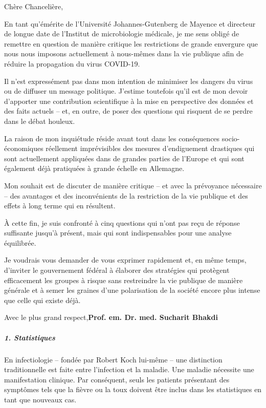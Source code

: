 Chère Chancelière,

En tant qu'émérite de l'Université Johannes-Gutenberg de Mayence et
directeur de longue date de l'Institut de microbiologie médicale, je me
sens obligé de remettre en question de manière critique les restrictions
de grande envergure que nous nous imposons actuellement à nous-mêmes
dans la vie publique afin de réduire la propagation du virus COVID-19.

Il n'est expressément pas dans mon intention de minimiser les dangers du
virus ou de diffuser un message politique. J'estime toutefois qu'il est
de mon devoir d'apporter une contribution scientifique à la mise en
perspective des données et des faits actuels -- et, en outre, de poser
des questions qui risquent de se perdre dans le débat houleux.

La raison de mon inquiétude réside avant tout dans les conséquences
socio-économiques réellement imprévisibles des mesures d'endiguement
drastiques qui sont actuellement appliquées dans de grandes parties de
l'Europe et qui sont également déjà pratiquées à grande échelle en
Allemagne.

Mon souhait est de discuter de manière critique -- et avec la prévoyance
nécessaire -- des avantages et des inconvénients de la restriction de la
vie publique et des effets à long terme qui en résultent.

À cette fin, je suis confronté à cinq questions qui n'ont pas reçu de
réponse suffisante jusqu'à présent, mais qui sont indispensables pour
une analyse équilibrée.

Je voudrais vous demander de vous exprimer rapidement et, en même temps,
d'inviter le gouvernement fédéral à élaborer des stratégies qui
protègent efficacement les groupes à risque sans restreindre la vie
publique de manière générale et à semer les graines d'une polarisation
de la société encore plus intense que celle qui existe déjà.

Avec le plus grand respect,\textbf{Prof. em. Dr. med. Sucharit Bhakdi}

\hypertarget{1-statistiques}{%
\subparagraph{\texorpdfstring{\textbf{1.
Statistiques}}{1. Statistiques}}\label{1-statistiques}}

En infectiologie -- fondée par Robert Koch lui-même -- une distinction
traditionnelle est faite entre l'infection et la maladie. Une maladie
nécessite une manifestation clinique. Par conséquent, seuls les patients
présentant des symptômes tels que la fièvre ou la toux doivent être
inclus dans les statistiques en tant que nouveaux cas.

